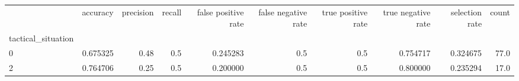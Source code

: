 \begin{tabular}{lrrrrrrrrr}
\toprule
{} &  accuracy &  precision &  recall &  false positive rate &  false negative rate &  true positive rate &  true negative rate &  selection rate &  count \\
tactical\_situation &           &            &         &                      &                      &                     &                     &                 &        \\
\midrule
0                  &  0.675325 &       0.48 &     0.5 &             0.245283 &                  0.5 &                 0.5 &            0.754717 &        0.324675 &   77.0 \\
2                  &  0.764706 &       0.25 &     0.5 &             0.200000 &                  0.5 &                 0.5 &            0.800000 &        0.235294 &   17.0 \\
\bottomrule
\end{tabular}
